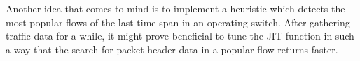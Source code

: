 \documentclass[conference]{IEEEtran}
\begin{document}
Another idea that comes to mind is to implement a heuristic which detects 
the most popular flows of the last time span in an operating switch.
After gathering traffic data for a while, it might prove beneficial to tune 
the JIT function in such a way that the search for packet header data in a popular flow returns faster.

\vspace{-0.3cm}
\balance





%






\end{document}
